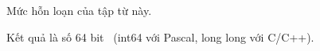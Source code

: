 Mức hỗn loạn của tập từ này.

Kết quả là số 64 bit  (int64 với Pascal, long long với C/C++).

\